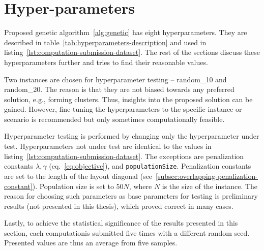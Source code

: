 \newpage


\section{Hyper-parameters}\label{sec:hyper-parameters}

Proposed genetic algorithm~\ref{alg:genetic} has eight hyperparameters.
They are described in table~\ref{tab:hyperparameters-description} and used in listing~\ref{lst:computation-submission-dataset}.
The rest of the sections discuss these hyperparameters further and tries to find their reasonable values.

Two instances are chosen for hyperparameter testing – random\_10 and random\_20.
The reason is that they are not biased towards any preferred solution, e.g., forming clusters.
Thus, insights into the proposed solution can be gained.
However, fine-tuning the hyperparameters to the specific instance or scenario is recommended but only sometimes computationally feasible.

Hyperparameter testing is performed by changing only the hyperparameter under test.
Hyperparameters not under test are identical to the values in listing~\ref{lst:computation-submission-dataset}.
The exceptions are penalization constants $\lambda, \gamma$ (eq.~\ref{eq:objective}), and \verb|populationSize|.
Penalization constants are set to the length of the layout diagonal (see~\ref{subsec:overlapping-penalization-constant}).
Population size is set to $50N$, where $N$ is the size of the instance.
The reason for choosing such parameters as base parameters for testing
is preliminary results (not presented in this thesis), which proved correct in many cases.

Lastly, to achieve the statistical significance of the results presented in this section, each computation\footnotemark[1] is submitted five times with a different random seed.
Presented values are thus an average from five samples.



